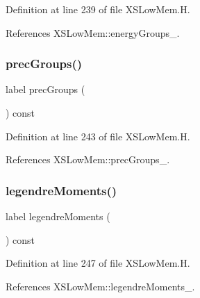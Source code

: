 Definition at line 239 of file X\+S\+Low\+Mem.\+H.



References X\+S\+Low\+Mem\+::energy\+Groups\+\_\+.

\mbox{\label{classFoam_1_1XSLowMem_aeb1380355ff0a9cc7ab7e8b55aea673b}} 
\subsubsection{\texorpdfstring{prec\+Groups()}{precGroups()}}
{\footnotesize\ttfamily label prec\+Groups (\begin{DoxyParamCaption}{ }\end{DoxyParamCaption}) const\hspace{0.3cm}{\ttfamily [inline]}}



Definition at line 243 of file X\+S\+Low\+Mem.\+H.



References X\+S\+Low\+Mem\+::prec\+Groups\+\_\+.

\mbox{\label{classFoam_1_1XSLowMem_ab1770d82e9777642e1373706c733606d}} 
\subsubsection{\texorpdfstring{legendre\+Moments()}{legendreMoments()}}
{\footnotesize\ttfamily label legendre\+Moments (\begin{DoxyParamCaption}{ }\end{DoxyParamCaption}) const\hspace{0.3cm}{\ttfamily [inline]}}



Definition at line 247 of file X\+S\+Low\+Mem.\+H.



References X\+S\+Low\+Mem\+::legendre\+Moments\+\_\+.

\mbox{\label{classFoam_1_1XSLowMem_af7bd963d20dabfe2e8c89aefe489694a}} 
